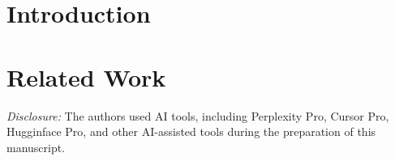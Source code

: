 \documentclass{ieeeaccess}
\begin{document}






\titlepgskip=-15pt

\maketitle

\section{Introduction}
\label{sec:introduction}


\section{Related Work}
\label{sec:relatedwork}














\vspace{1em}
\textit{Disclosure:} The authors used AI tools, including Perplexity Pro, Cursor Pro, Hugginface Pro, and other AI-assisted tools during the preparation of this manuscript.



\EOD
\end{document}
